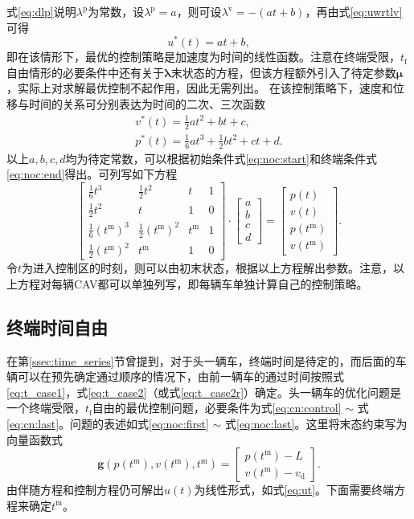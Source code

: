 式\eqref{eq:dlp}说明$\lambda^\mathrm{p}$为常数，设$\lambda^\mathrm{p}=a$，则可设$\lambda^\mathrm{v}=-(at+b)$，再由式\eqref{eq:uwrtlv}可得
\begin{equation}
u^*(t)=at+b,
\label{eq:ut}
\end{equation}
即在该情形下，最优的控制策略是加速度为时间的线性函数。注意在终端受限，$t_\mathrm{f}$自由情形的必要条件中还有关于$\bm{\lambda}$末状态的方程，但该方程额外引入了待定参数$\bm{\mu}$，实际上对求解最优控制不起作用，因此无需列出。
在该控制策略下，速度和位移与时间的关系可分别表达为时间的二次、三次函数
\begin{gather}
v^*(t)=\frac12at^2+bt+c,\\
p^*(t)=\frac16at^3+\frac12bt^2+ct+d.
\end{gather}
以上$a,b,c,d$均为待定常数，可以根据初始条件式\eqref{eq:noc:start}和终端条件式\eqref{eq:noc:end}得出。可列写如下方程
\begin{equation}
\begin{bmatrix}
\frac16t^3 & \frac12t^2 & t & 1 \\
\frac12t^2 & t & 1 & 0 \\
\frac16(t^\mathrm{m})^3 & \frac12(t^\mathrm{m})^2 & t^\mathrm{m} & 1 \\
\frac12(t^\mathrm{m})^2 & t^\mathrm{m} & 1 & 0
\end{bmatrix}\cdot
\begin{bmatrix}
a\\b\\c\\d
\end{bmatrix}
 = \begin{bmatrix}
p(t)\\v(t)\\p(t^\mathrm{m})\\v(t^\mathrm{m})
\end{bmatrix}.
\label{eq:noc:array}
\end{equation}
令$t$为进入控制区的时刻，则可以由初末状态，根据以上方程解出参数。注意，以上方程对每辆CAV都可以单独列写，即每辆车单独计算自己的控制策略。

\subsection{终端时间自由}
\label{ssec:freetf}
在第\ref{ssec:time_series}节曾提到，对于头一辆车，终端时间是待定的，而后面的车辆可以在预先确定通过顺序的情况下，由前一辆车的通过时间按照式\eqref{eq:t_case1}，式\eqref{eq:t_case2}（或式\eqref{eq:t_case2r}）确定。头一辆车的优化问题是一个终端受限，$t_\mathrm{f}$自由的最优控制问题，必要条件为式\eqref{eq:cn:control} $\sim$ 式\eqref{eq:cn:last}。问题的表述如式\eqref{eq:noc:first} $\sim$ 式\eqref{eq:noc:last}。这里将末态约束写为向量函数式
\begin{equation}
\bm{g}(p(t^\mathrm{m}),v(t^\mathrm{m}),t^\mathrm{m})=
\begin{bmatrix}
p(t^\mathrm{m})-L\\
v(t^\mathrm{m})-v_\mathrm{d}
\end{bmatrix}.
\end{equation}
由伴随方程和控制方程仍可解出$u(t)$为线性形式，如式\eqref{eq:ut}。下面需要终端方程来确定$t^\mathrm{m}$。

